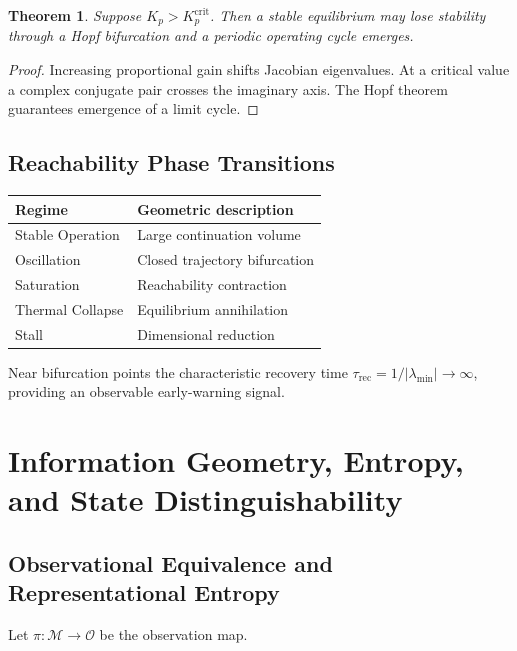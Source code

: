 \documentclass[12pt,a4paper]{article}
\newtheorem{theorem}{Theorem}[section]
\newcommand{\M}{\mathcal{M}}
\begin{document}
\begin{theorem}
Suppose $K_p > K_p^{\mathrm{crit}}$. Then a stable equilibrium may lose stability through a Hopf bifurcation and a periodic operating cycle emerges.
\end{theorem}

\begin{proof}
Increasing proportional gain shifts Jacobian eigenvalues. At a critical value a complex conjugate pair crosses the imaginary axis. The Hopf theorem guarantees emergence of a limit cycle.
\end{proof}

\subsection{Reachability Phase Transitions}

\begin{center}
\begin{tabular}{ll}
\toprule
Regime & Geometric description \\
\midrule
Stable Operation & Large continuation volume \\
Oscillation & Closed trajectory bifurcation \\
Saturation & Reachability contraction \\
Thermal Collapse & Equilibrium annihilation \\
Stall & Dimensional reduction \\
\bottomrule
\end{tabular}
\end{center}

Near bifurcation points the characteristic recovery time $\tau_{\mathrm{rec}} = 1/|\lambda_{\min}| \to \infty$, providing an observable early-warning signal.

\section{Information Geometry, Entropy, and State Distinguishability}

\subsection{Observational Equivalence and Representational Entropy}

Let $\pi : \M \to \mathcal{O}$ be the observation map.
\end{document}
